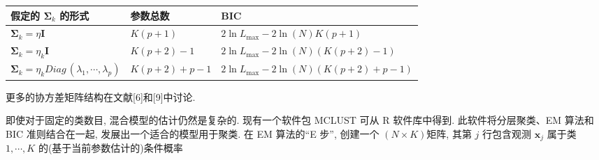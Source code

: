 \begin{mvtable}
\begin{tabular}{lll}
\toprule
假定的 $\boldsymbol{\Sigma}_k$ 的形式 & 参数总数 & BIC\\
\midrule
$\boldsymbol{\Sigma}_k=\eta\mathbf{I}$ & $K(p+1)$ & $2\ln L_{\max}-2\ln(N)K(p+1)$\\
$\boldsymbol{\Sigma}_k=\eta_k\mathbf{I}$ & $K(p+2)-1$ & $2\ln L_{\max}-2\ln(N)(K(p+2)-1)$\\
$\boldsymbol{\Sigma}_k=\eta_k\mathit{Diag}\,(\lambda_1,\cdots,\lambda_p)$ & $K(p+2)+p-1$ & $2\ln L_{\max}-2\ln(N)(K(p+2)+p-1)$\\
\bottomrule
\end{tabular}
\end{mvtable}

更多的协方差矩阵结构在文献[6]和[9]中讨论.

即使对于固定的类数目, 混合模型的估计仍然是复杂的. 现有一个软件包 MCLUST 可从 R 软件库中得到. 此软件将分层聚类、EM 算法和 BIC 准则结合在一起, 发展出一个适合的模型用于聚类. 在 EM 算法的“E 步”, 创建一个 $(N\times K)$矩阵, 其第 $j$ 行包含观测 $\mathbf{x}_j$ 属于类 $1,\cdots,K$ 的(基于当前参数估计的)条件概率
